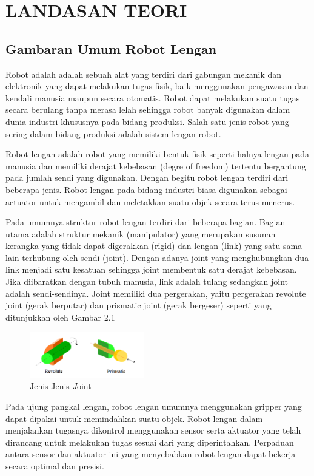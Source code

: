 \chapter{LANDASAN TEORI}

\section{Gambaran Umum Robot Lengan}

Robot adalah adalah sebuah alat yang terdiri dari gabungan mekanik dan elektronik yang dapat melakukan tugas fisik, baik menggunakan pengawasan dan kendali manusia maupun secara otomatis. Robot dapat melakukan suatu tugas secara berulang tanpa merasa lelah sehingga robot banyak digunakan dalam dunia industri khususnya pada bidang produksi. Salah satu jenis robot yang sering dalam bidang produksi adalah sistem lengan robot.

Robot lengan adalah robot yang memiliki bentuk fisik seperti halnya lengan pada manusia dan memiliki derajat kebebasan (degre of freedom) tertentu bergantung pada jumlah sendi yang digunakan. Dengan begitu robot lengan terdiri dari beberapa jenis. Robot lengan pada bidang industri biasa digunakan sebagai actuator untuk mengambil dan meletakkan suatu objek secara terus menerus.
	

Pada umumnya struktur robot lengan terdiri dari beberapa bagian.  Bagian utama adalah struktur mekanik (manipulator) yang merupakan susunan kerangka yang tidak dapat digerakkan (rigid) dan lengan (link) yang satu sama lain terhubung oleh sendi (joint). Dengan adanya joint yang menghubungkan dua link menjadi satu kesatuan sehingga joint membentuk satu derajat kebebasan. Jika diibaratkan dengan tubuh manusia, link adalah tulang sedangkan joint adalah sendi-sendinya. Joint memiliki dua pergerakan, yaitu pergerakan revolute joint (gerak berputar) dan prismatic joint (gerak bergeser) seperti yang ditunjukkan oleh Gambar 2.1

	\begin{figure}[H]
	\centering
	\includegraphics[width=5cm]{gambar/joint.png}
	\caption{Jenis-Jenis \emph Joint}
\end{figure}

Pada ujung pangkal lengan, robot lengan umumnya menggunakan gripper yang dapat dipakai untuk memindahkan suatu objek. Robot lengan dalam menjalankan tugasnya dikontrol menggunakan sensor serta aktuator yang telah dirancang untuk melakukan tugas sesuai dari yang diperintahkan. Perpaduan antara sensor dan aktuator ini yang menyebabkan robot lengan dapat bekerja secara optimal dan presisi.

